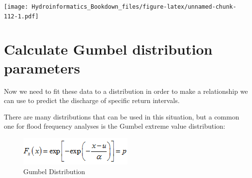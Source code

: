 \documentclass[
]{book}
\newenvironment{Shaded}{\begin{snugshade}}{\end{snugshade}}
\newcommand{\AttributeTok}[1]{\textcolor[rgb]{0.77,0.63,0.00}{#1}}
\newcommand{\CommentTok}[1]{\textcolor[rgb]{0.56,0.35,0.01}{\textit{#1}}}
\newcommand{\DecValTok}[1]{\textcolor[rgb]{0.00,0.00,0.81}{#1}}
\newcommand{\FloatTok}[1]{\textcolor[rgb]{0.00,0.00,0.81}{#1}}
\newcommand{\FunctionTok}[1]{\textcolor[rgb]{0.00,0.00,0.00}{#1}}
\newcommand{\NormalTok}[1]{#1}
\newcommand{\OtherTok}[1]{\textcolor[rgb]{0.56,0.35,0.01}{#1}}
\newcommand{\SpecialCharTok}[1]{\textcolor[rgb]{0.00,0.00,0.00}{#1}}
\begin{document}
\begin{Shaded}
\end{Shaded}

\texttt{[image: Hydroinformatics\_Bookdown\_files/figure-latex/unnamed-chunk-112-1.pdf]}

\hypertarget{calculate-gumbel-distribution-parameters}{%
\section{Calculate Gumbel distribution parameters}\label{calculate-gumbel-distribution-parameters}}

Now we need to fit these data to a distribution in order to make a relationship we can use to predict the discharge of specific return intervals.

There are many distributions that can be used in this situation, but a common one for flood frequency analyses is the Gumbel extreme value distribution:

\begin{figure}
\centering
\includegraphics{images/gumbel.png}
\caption{Gumbel Distribution}
\end{figure}
\end{document}
